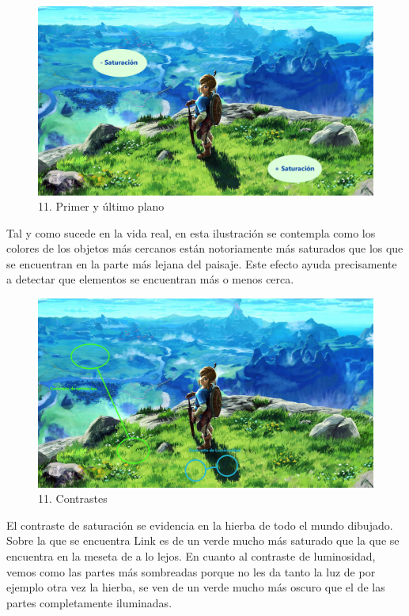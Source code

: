 \documentclass[12pt]{article}
\begin{document}
  \begin{figure}[H]
    \centering
    \includegraphics[width=\textwidth]{images/Carlos/15/Planos.jpg}
    \caption{\small 11. Primer y último plano}
  \end{figure}
  Tal y como sucede en la vida real, en esta ilustración se contempla como los colores de los objetos más cercanos están notoriamente más saturados que los que se encuentran en la parte más lejana del paisaje. Este efecto ayuda precisamente a detectar que elementos se encuentran más o menos cerca.

  \begin{figure}[H]
    \centering
    \includegraphics[width=\textwidth]{images/Carlos/15/Contrastes.jpg}
    \caption{\small 11. Contrastes}
  \end{figure}
  El contraste de saturación se evidencia en la hierba de todo el mundo dibujado. Sobre la que se encuentra Link es de un verde mucho más saturado que la que se encuentra en la meseta de a lo lejos. En cuanto al contraste de luminosidad, vemos como las partes más sombreadas porque no les da tanto la luz de por ejemplo otra vez la hierba, se ven de un verde mucho más oscuro que el de las partes completamente iluminadas.
        \newpage
\end{document}
